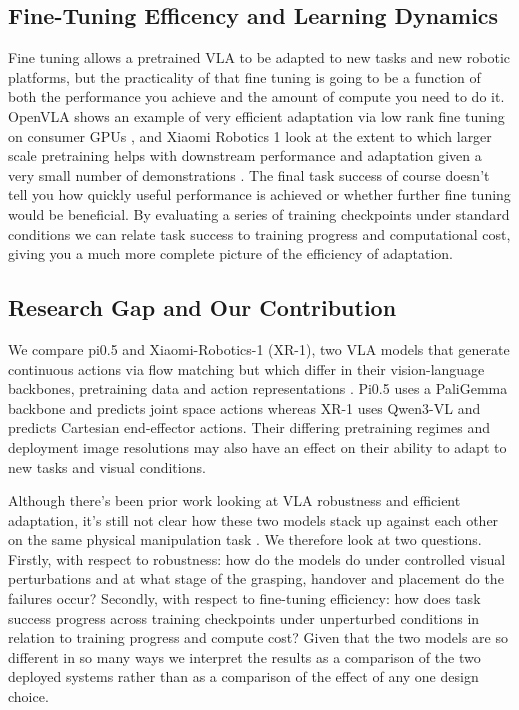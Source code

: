\documentclass[10pt,twocolumn,letterpaper]{article}
\begin{document}
\subsection{Fine-Tuning Efficency and Learning Dynamics}
Fine tuning allows a pretrained VLA to be adapted to new tasks and new robotic platforms, but the practicality of that fine tuning is going to be a function of both the performance you achieve and the amount of compute you need to do it. OpenVLA shows an example of very efficient adaptation via low rank fine tuning on consumer GPUs \cite{kim2025openvla}, and Xiaomi Robotics 1 look at the extent to which larger scale pretraining helps with downstream performance and adaptation given a very small number of demonstrations \cite{team2026xiaomi}. The final task success of course doesn't tell you how quickly useful performance is achieved or whether further fine tuning would be beneficial. By evaluating a series of training checkpoints under standard conditions we can relate task success to training progress and computational cost, giving you a much more complete picture of the efficiency of adaptation.

\subsection{Research Gap and Our Contribution}
We compare pi0.5 and Xiaomi-Robotics-1 (XR-1), two VLA models that generate continuous actions via flow matching but which differ in their vision-language backbones, pretraining data and action representations \cite{black2025pi05,team2026xiaomi}. Pi0.5 uses a PaliGemma backbone and predicts joint space actions whereas XR-1 uses Qwen3-VL and predicts Cartesian end-effector actions. Their differing pretraining regimes and deployment image resolutions may also have an effect on their ability to adapt to new tasks and visual conditions.

Although there's been prior work looking at VLA robustness and efficient adaptation, it's still not clear how these two models stack up against each other on the same physical manipulation task \cite{fei2026liberoplus,guo2026robustvla}. We therefore look at two questions. Firstly, with respect to robustness: how do the models do under controlled visual perturbations and at what stage of the grasping, handover and placement do the failures occur? Secondly, with respect to fine-tuning efficiency: how does task success progress across training checkpoints under unperturbed conditions in relation to training progress and compute cost? Given that the two models are so different in so many ways we interpret the results as a comparison of the two deployed systems rather than as a comparison of the effect of any one design choice.
\end{document}
